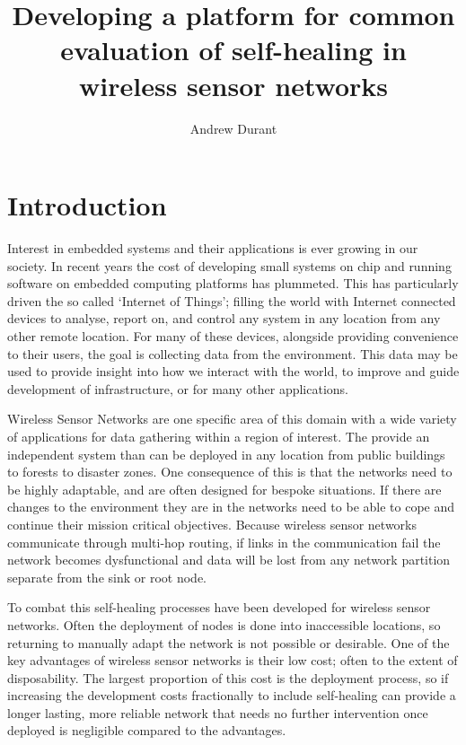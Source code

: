 \documentclass[authoryearcitations]{UoYCSproject}
\author{Andrew Durant}
\title{Developing a platform for common evaluation of self-healing in wireless sensor networks}
\begin{document}
\maketitle
\listoffigures
\listoftables
\renewcommand{\lstlistlistingname}{List of Listings}
\lstlistoflistings

\chapter{Introduction}
\label{cha:Introduction}

Interest in embedded systems and their applications is ever growing in our society. In recent years the cost of developing small systems on chip and running software on embedded computing platforms has plummeted. This has particularly driven the so called `Internet of Things'; filling the world with Internet connected devices to analyse, report on, and control any system in any location from any other remote location. For many of these devices, alongside providing convenience to their users, the goal is collecting data from the environment. This data may be used to provide insight into how we interact with the world, to improve and guide development of infrastructure, or for many other applications.

Wireless Sensor Networks are one specific area of this domain with a wide variety of applications for data gathering within a region of interest. The provide an independent system than can be deployed in any location from public buildings to forests to disaster zones. One consequence of this is that the networks need to be highly adaptable, and are often designed for bespoke situations. If there are changes to the environment they are in the networks need to be able to cope and continue their mission critical objectives. Because wireless sensor networks communicate through multi-hop routing, if links in the communication fail the network becomes dysfunctional and data will be lost from any network partition separate from the sink or root node.

To combat this self-healing processes have been developed for wireless sensor networks. Often the deployment of nodes is done into inaccessible locations, so returning to manually adapt the network is not possible or desirable. One of the key advantages of wireless sensor networks is their low cost; often to the extent of disposability. The largest proportion of this cost is the deployment process, so if increasing the development costs fractionally to include self-healing can provide a longer lasting, more reliable network that needs no further intervention once deployed is negligible compared to the advantages.
\end{document}
